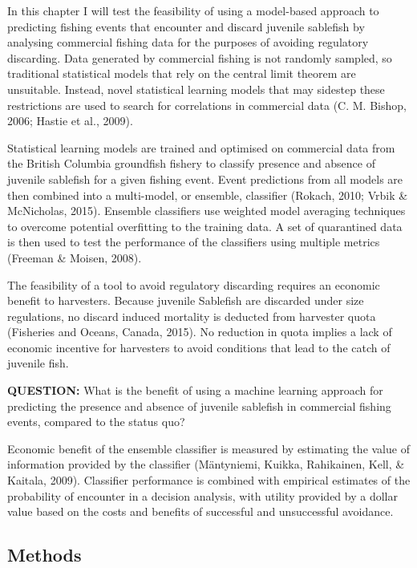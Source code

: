 \documentclass[12pt,]{scrartcl}
\begin{document}
In this chapter I will test the feasibility of using a model-based
approach to predicting fishing events that encounter and discard
juvenile sablefish by analysing commercial fishing data for the purposes
of avoiding regulatory discarding. Data generated by commercial fishing
is not randomly sampled, so traditional statistical models that rely on
the central limit theorem are unsuitable. Instead, novel statistical
learning models that may sidestep these restrictions are used to search
for correlations in commercial data (C. M. Bishop, 2006; Hastie et al.,
2009).

Statistical learning models are trained and optimised on commercial data
from the British Columbia groundfish fishery to classify presence and
absence of juvenile sablefish for a given fishing event. Event
predictions from all models are then combined into a multi-model, or
ensemble, classifier (Rokach, 2010; Vrbik \& McNicholas, 2015). Ensemble
classifiers use weighted model averaging techniques to overcome
potential overfitting to the training data. A set of quarantined data is
then used to test the performance of the classifiers using multiple
metrics (Freeman \& Moisen, 2008).

The feasibility of a tool to avoid regulatory discarding requires an
economic benefit to harvesters. Because juvenile Sablefish are discarded
under size regulations, no discard induced mortality is deducted from
harvester quota (Fisheries and Oceans, Canada, 2015). No reduction in
quota implies a lack of economic incentive for harvesters to avoid
conditions that lead to the catch of juvenile fish.

\textbf{QUESTION:} What is the benefit of using a machine learning
approach for predicting the presence and absence of juvenile sablefish
in commercial fishing events, compared to the status quo?

Economic benefit of the ensemble classifier is measured by estimating
the value of information provided by the classifier (Mäntyniemi, Kuikka,
Rahikainen, Kell, \& Kaitala, 2009). Classifier performance is combined
with empirical estimates of the probability of encounter in a decision
analysis, with utility provided by a dollar value based on the costs and
benefits of successful and unsuccessful avoidance.

\subsection{Methods}\label{methods-3}
\end{document}
